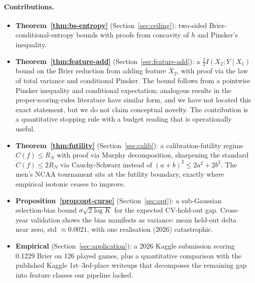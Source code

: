 \documentclass[11pt,a4paper]{article}
\theoremstyle{definition}
\begin{document}
\paragraph{Contributions.}
\begin{itemize}[leftmargin=*,itemsep=0pt]
\item \textbf{Theorem~\ref{thm:bs-entropy}} (Section~\ref{sec:ceiling}): two-sided Brier-conditional-entropy bounds with proofs from concavity of $h$ and Pinsker's inequality.
\item \textbf{Theorem~\ref{thm:feature-add}} (Section~\ref{sec:feature-add}): a $\frac{1}{2} I(X_2; Y \mid X_1)$ bound on the Brier reduction from adding feature $X_2$, with proof via the law of total variance and conditional Pinsker. The bound follows from a pointwise Pinsker inequality and conditional expectation; analogous results in the proper-scoring-rules literature \citep{reidwilliamson2011, bujastuetzleshen2005} have similar form, and we have not located this exact statement, but we do not claim conceptual novelty. The contribution is a quantitative stopping rule with a budget reading that is operationally useful.
\item \textbf{Theorem~\ref{thm:futility}} (Section~\ref{sec:calib}): a calibration-futility regime $C(f) \le R_N$ with proof via Murphy decomposition, sharpening the standard $C(f) \le 2 R_N$ via Cauchy-Schwarz instead of $(a+b)^2 \le 2a^2 + 2b^2$. The men's NCAA tournament sits at the futility boundary, exactly where empirical isotonic ceases to improve.
\item \textbf{Proposition~\ref{prop:opt-curse}} (Section~\ref{sec:opt}): a sub-Gaussian selection-bias bound $\sigma \sqrt{2 \log K}$ for the expected CV-hold-out gap. Cross-year validation shows the bias manifests as variance: mean held-out delta near zero, std $\approx 0.0021$, with one realisation (2026) catastrophic.
\item \textbf{Empirical} (Section~\ref{sec:application}): a 2026 Kaggle submission scoring 0.1229 Brier on 126 played games, plus a quantitative comparison with the published Kaggle 1st--3rd-place writeups that decomposes the remaining gap into feature classes our pipeline lacked.
\end{itemize}
\end{document}

